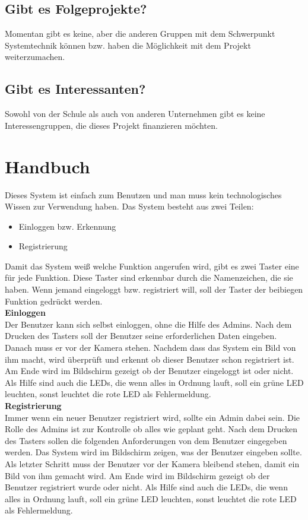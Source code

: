 \section{Gibt es Folgeprojekte?}
Momentan gibt es keine, aber die anderen Gruppen mit dem Schwerpunkt Systemtechnik können bzw. haben die Möglichkeit mit dem Projekt weiterzumachen.
\section{Gibt es Interessanten?}
Sowohl von der Schule als auch von anderen Unternehmen gibt es keine Interessengruppen, die dieses Projekt finanzieren möchten.
\chapter{Handbuch}
Dieses System ist einfach zum Benutzen und man muss kein technologisches Wissen zur Verwendung haben. Das System besteht aus zwei Teilen: 
\begin{itemize}
	\item Einloggen bzw. Erkennung 
	\item Registrierung 
\end{itemize}
Damit das System weiß welche Funktion angerufen wird, gibt es zwei Taster eine für jede Funktion. Diese Taster sind erkennbar durch die Namenzeichen, die sie haben. Wenn jemand eingeloggt bzw. registriert will, soll der Taster der beibiegen Funktion gedrückt werden. \\
\textbf{Einloggen} \\
Der Benutzer kann sich selbst einloggen, ohne die Hilfe des Admins. Nach dem Drucken des Tasters soll der Benutzer seine erforderlichen Daten eingeben. Danach muss er vor der Kamera stehen. Nachdem dass das System ein Bild von ihm macht, wird überprüft und erkennt ob dieser Benutzer schon registriert ist. Am Ende wird im Bildschirm gezeigt ob der Benutzer eingeloggt ist oder nicht. Als Hilfe sind auch die LEDs, die wenn alles in Ordnung lauft, soll ein grüne LED leuchten, sonst leuchtet die rote LED als Fehlermeldung. \\
\textbf{Registrierung} \\
Immer wenn ein neuer Benutzer registriert wird, sollte ein Admin dabei sein. Die Rolle des Admins ist zur Kontrolle ob alles wie geplant geht. Nach dem Drucken des Tasters sollen die folgenden Anforderungen von dem Benutzer eingegeben werden. Das System wird im Bildschirm zeigen, was der Benutzer eingeben sollte. Als letzter Schritt muss der Benutzer vor der Kamera bleibend stehen, damit ein Bild von ihm gemacht wird. Am Ende wird im Bildschirm gezeigt ob der Benutzer registriert wurde oder nicht.  Als Hilfe sind auch die LEDs, die wenn alles in Ordnung lauft, soll ein grüne LED leuchten, sonst leuchtet die rote LED als Fehlermeldung. \\
